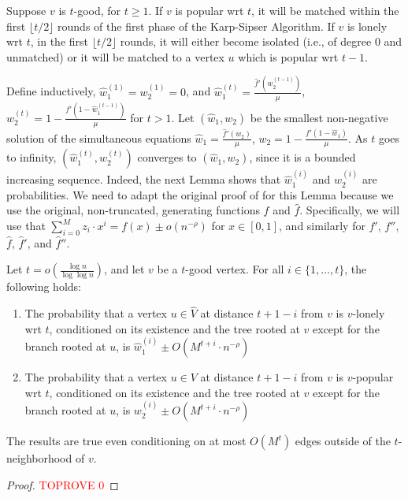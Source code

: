 \documentclass[11pt]{article}
\newcommand{\maxdeg}{M}
\begin{document}
\begin{toappendix}
\begin{lemma}\label{lem:bg-3-5}
Suppose $v$ is $t$-good, for $t\geq 1$. If $v$ is popular wrt $t$, it will be matched within the first $\lfloor t/2 \rfloor$ rounds of the first phase of the Karp-Sipser Algorithm. If $v$ is lonely wrt $t$, in the first $\lfloor t/2\rfloor$ rounds, it will either become isolated (i.e., of degree $0$ and unmatched) or it will be matched to a vertex $u$ which is popular wrt $t-1$.
\end{lemma}

Define inductively, $\hat{w}_1^{(1)} = w_2^{(1)} = 0$, and $\hat{w}_1^{(t)} = \frac{\hat{f}'(w_2^{(t-1)})}{\mu}$, $w_2^{(t)} = 1 - \frac{f'(1 - \hat{w}_1^{(t-1)})}{\mu}$ for $t>1$. Let $(\hat{w}_1, w_2)$ be the smallest non-negative solution of the simultaneous equations $\hat{w}_1 = \frac{\hat{f}'(w_2)}{\mu}$, $w_2 = 1 - \frac{f'(1 - \hat{w}_1)}{\mu}$. As $t$ goes to infinity, $(\hat{w}_1^{(t)}, w_2^{(t)})$ converges to $(\hat{w}_1, w_2)$, since it is a bounded increasing sequence. Indeed, the next Lemma shows that $\hat{w}_1^{(i)}$ and ${w}_2^{(i)}$ are probabilities. We need to adapt the original proof of \cite{bg15} for this Lemma because we use the original, non-truncated, generating functions $f$ and $\hat{f}$. Specifically, we will use that $\sum_{i=0}^M z_i \cdot x^i = f(x) \pm o(n^{-\rho})$ for $x\in[0,1]$, and similarly for $f'$, $f''$, $\hat{f}$, $\hat{f}'$, and $\hat{f}''$.

\begin{lemma}\label{lem:bg-adaptation-3-6}
Let $t=o\left(\frac{\log n}{\log\log n}\right)$, and let $v$ be a $t$-good vertex. For all $i\in\{1,\dots, t\}$, the following holds:
\begin{enumerate}
\item The probability that a vertex $u\in \hat{V}$ at distance $t+1-i$ from $v$ is $v$-lonely wrt $t$, conditioned on its existence and the tree rooted at $v$ except for the branch rooted at $u$, is $\hat{w}_1^{(i)} \pm O(\maxdeg^{t+i} \cdot n^{-\rho})$
\item The probability that a vertex $u\in V$ at distance $t+1-i$ from $v$ is $v$-popular wrt $t$, conditioned on its existence and the tree rooted at $v$ except for the branch rooted at $u$, is $w_2^{(i)} \pm O(\maxdeg^{t+i} \cdot n^{-\rho})$
\end{enumerate}
The results are true even conditioning on at most $O(\maxdeg^t)$ edges outside of the $t$-neighborhood of $v$.
\end{lemma}
\begin{proof}\textcolor{red}{TOPROVE 0}\end{proof}


\end{toappendix}
\end{document}
